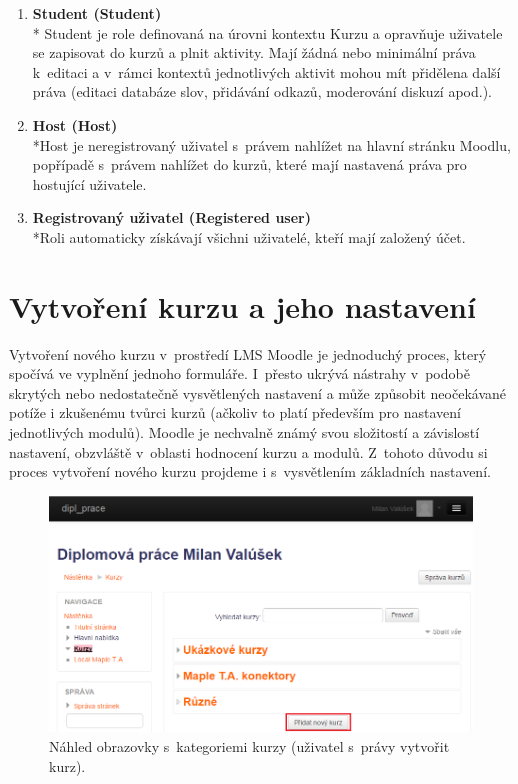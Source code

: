 \documentclass[
print,
  11pt,
  table,   
  nolof,    
  nolot,
  oneside,final
]{fithesis3}
\begin{document}
\begin{enumerate}
\item \textbf{Student (Student)} \\*
	Student je role definovaná na úrovni kontextu Kurzu a opravňuje uživatele se zapisovat do kurzů a plnit aktivity. Mají žádná nebo minimální práva k~editaci a v~rámci kontextů jednotlivých aktivit mohou mít přidělena další práva (editaci databáze slov, přidávání odkazů, moderování diskuzí apod.).

\item \textbf{Host (Host)} \\*Host je neregistrovaný uživatel s~právem nahlížet na hlavní stránku Moodlu, popřípadě s~právem nahlížet do kurzů, které mají nastavená práva pro hostující uživatele.

\item \textbf{Registrovaný uživatel (Registered user)} \\*Roli automaticky získávají všichni uživatelé, kteří mají založený účet.

\end{enumerate}


	\section{Vytvoření kurzu a jeho nastavení}
Vytvoření nového kurzu v~prostředí LMS Moodle je jednoduchý proces, kte\-rý spočívá ve vyplnění jednoho formuláře. I~přesto ukrývá nástrahy v~podobě skrytých nebo nedostatečně vysvětlených nastavení a může způsobit neočekávané potíže i zkušenému tvůrci kurzů (ačkoliv to platí především pro nastavení jednotlivých modulů). Moodle je nechvalně známý svou složitostí a závislostí nastavení, obzvláště v~oblasti hodnocení kurzu a modulů. Z~tohoto důvodu si proces vytvoření nového kurzu projdeme i s~vysvětlením základních nastavení.
		\begin{figure}
		  \begin{center}
		    \includegraphics[width=120mm]{images/kurzy-pridani.png}
		   \end{center}
		  \caption{Náhled obrazovky s~kategoriemi kurzy (uživatel s~právy vytvořit kurz).  }
		  \label{fig:moodlekurzypridani}
		\end{figure}
\end{document}
